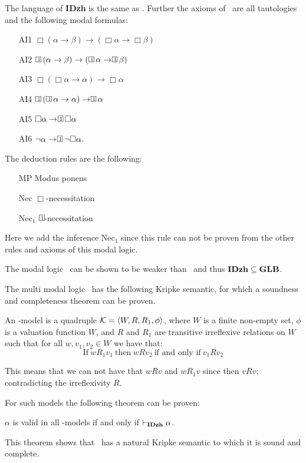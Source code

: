 \documentclass[../main.tex]{subfiles}
\begin{document}
\begin{defi}
	The language of \textbf{IDzh} is the same as \GLB. Further the axioms
	of \IDzh\ are all tautologies and the following modal formulas:
	\begin{enumerate}
		\item[AI1]
			$\Box(\alpha\rightarrow\beta)\rightarrow(\Box\alpha\rightarrow\Box\beta)$
		\item[AI2]
			$\OneBox(\alpha\rightarrow\beta)\rightarrow(\OneBox\alpha\rightarrow\OneBox\beta)$
		\item[AI3] $\Box(\Box\alpha\rightarrow\alpha)\rightarrow\Box\alpha$
		\item[AI4] $\OneBox(\OneBox\alpha\rightarrow\alpha)\rightarrow\OneBox\alpha$
		\item[AI5] $\Box\alpha\rightarrow\OneBox\Box\alpha$
		\item[AI6] $\neg\alpha\rightarrow\OneBox\neg\Box\alpha$.
	\end{enumerate}
	The deduction rules are the following:
	\begin{enumerate}
		\item[MP] Modus ponens 
		\item[Nec] $\Box$-necessitation
		\item[Nec$_1$] $\OneBox$-necessitation
	\end{enumerate}
	Here we add the inference Nec$_1$ since this rule can not be proven
	from the other rules and axioms of this modal logic.
\end{defi}
The modal logic \IDzh\ can be shown to be weaker than \GLB\ and thus
$\text{\textbf{IDzh}}\subseteq\text{\textbf{GLB}}$.

The multi modal logic \IDzh\ has the following Kripke semantic, for which a soundness and
completeness theorem can be proven.
\begin{defi}
	An \IDzh-model is a quadruple $\mathcal{K}=\langle W,R,R_1,\phi\rangle$, where
	$W$ is a finite non-empty set, $\phi$ is a valuation function $W$, and
	$R$ and $R_1$ are transitive irreflexive relations on $W$ such that for
	all $w,v_1,v_2\in W$ we have that:
	\[\text{If}\ wR_1v_1\ \text{then}\ wRv_2\ \text{if and only if}\
	v_1Rv_2\]
\end{defi}
This means that we can not have that $wRv$ and $wR_1v$ since then $vRv$;
contradicting the irreflexivity $R$.

For such models the following theorem can be proven:
\begin{thm}
	$\alpha$ is valid in all \IDzh-models if and only if
	$\vdash_{\text{\textbf{IDzh}}}\alpha$.
\end{thm}
This theorem shows that \IDzh\ has a natural Kripke semantic to which it is
sound and complete.
\end{document}
